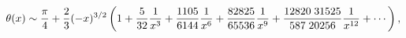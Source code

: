\[\mathop{\theta\/}\nolimits\!\left(x\right)\sim\frac{\pi}{4}+\frac{2}{3}(-x)^{3%
/2}\left(1+\frac{5}{32}\frac{1}{x^{3}}+\frac{1105}{6144}\frac{1}{x^{6}}+\frac{%
82825}{65536}\frac{1}{x^{9}}+\frac{12820\;31525}{587\;20256}\frac{1}{x^{12}}+%
\cdots\right),\]